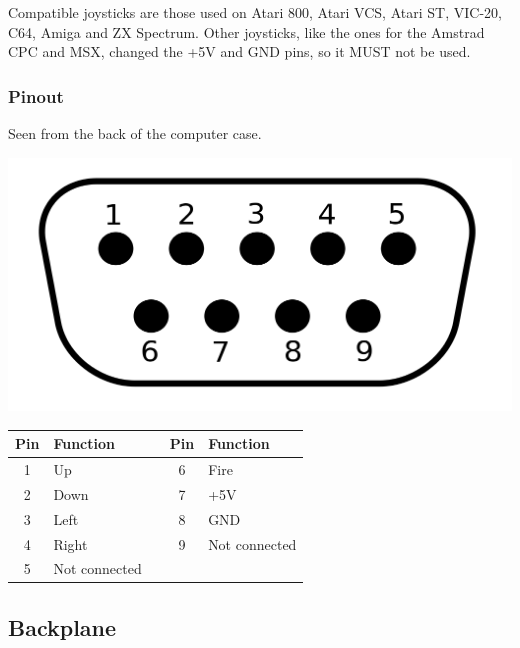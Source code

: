 \documentclass[a4paper,11pt]{article}
\begin{document}
    Compatible joysticks are those used on Atari 800, Atari VCS, Atari ST,
    VIC-20, C64, Amiga and ZX Spectrum. Other joysticks, like the ones for the 
    Amstrad CPC and MSX, changed the +5V and GND pins, so it MUST not be used.

        \subsubsection{Pinout}

        Seen from the back of the computer case.

        \includegraphics[scale=0.2]{JoystickPortPinout.png}
        

        \begin{tabular}{| c | m{3.8cm} | c | c | m{3.5cm} | }
            \hline
            \rowcolor{lightgray}
            Pin & Function & & Pin & Function\\
            \hline
            1 & Up & & 6 & Fire\\
            \hline
            2 & Down & & 7 & +5V\\
            \hline
            3 & Left & & 8 & GND\\
            \hline
            4 & Right & & 9 & Not connected\\
            \hline
            5 & Not connected & & & \\
            \hline
        \end{tabular}


    \subsection{Backplane}
\end{document}
